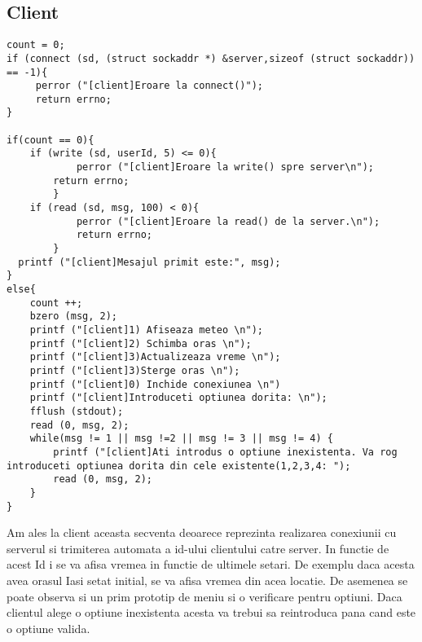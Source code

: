 \documentclass{llncs}
\begin{document}
\subsection{Client}
%
\begin{lstlisting}
count = 0;
if (connect (sd, (struct sockaddr *) &server,sizeof (struct sockaddr)) == -1){
	 perror ("[client]Eroare la connect()");
	 return errno;
}

if(count == 0){
	if (write (sd, userId, 5) <= 0){
     		perror ("[client]Eroare la write() spre server\n");
		return errno;
    	}
	if (read (sd, msg, 100) < 0){
      		perror ("[client]Eroare la read() de la server.\n");
      		return errno;
    	}
  printf ("[client]Mesajul primit este:", msg);
}
else{
	count ++;
	bzero (msg, 2);
	printf ("[client]1) Afiseaza meteo \n");
	printf ("[client]2) Schimba oras \n");
	printf ("[client]3)Actualizeaza vreme \n");
	printf ("[client]3)Sterge oras \n");
	printf ("[client]0) Inchide conexiunea \n")
	printf ("[client]Introduceti optiunea dorita: \n");
	fflush (stdout);
	read (0, msg, 2);
	while(msg != 1 || msg !=2 || msg != 3 || msg != 4) {
		printf ("[client]Ati introdus o optiune inexistenta. Va rog introduceti optiunea dorita din cele existente(1,2,3,4: ");
		read (0, msg, 2);
	}
}
\end{lstlisting}
%
Am ales la client aceasta secventa deoarece reprezinta realizarea conexiunii cu serverul si trimiterea automata a id-ului clientului catre server.
In functie de acest Id i se va afisa vremea in functie de ultimele setari. De exemplu daca acesta avea orasul Iasi setat initial,
se va afisa vremea din acea locatie. De asemenea se poate observa si un prim prototip de meniu si o verificare
pentru optiuni. Daca clientul alege o optiune inexistenta acesta va trebui sa reintroduca pana cand este o optiune valida.
%
\end{document}
